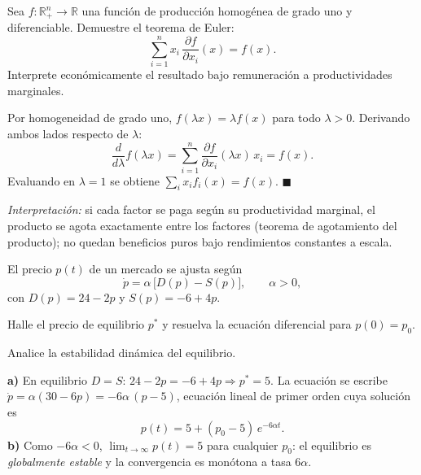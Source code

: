 \documentclass{academic-exam}
\begin{document}
\begin{pregunta}[5][Demostración]
Sea $f\colon\mathbb{R}^{n}_{+}\to\mathbb{R}$ una función de producción
homogénea de grado uno y diferenciable. Demuestre el teorema de Euler:
\[
  \sum_{i=1}^{n} x_i\,\frac{\partial f}{\partial x_i}(x) = f(x).
\]
Interprete económicamente el resultado bajo remuneración a productividades
marginales.
\espaciorespuesta{7cm}
\begin{solucion}
Por homogeneidad de grado uno, $f(\lambda x)=\lambda f(x)$ para todo
$\lambda>0$. Derivando ambos lados respecto de $\lambda$:
\[
  \frac{d}{d\lambda} f(\lambda x)
  = \sum_{i=1}^{n} \frac{\partial f}{\partial x_i}(\lambda x)\,x_i
  = f(x).
\]
Evaluando en $\lambda = 1$ se obtiene
$\sum_i x_i f_i(x) = f(x)$. \hfill$\blacksquare$

\emph{Interpretación:} si cada factor se paga según su productividad
marginal, el producto se agota exactamente entre los factores
(teorema de agotamiento del producto); no quedan beneficios puros bajo
rendimientos constantes a escala.
\end{solucion}
\end{pregunta}

\begin{pregunta}
El precio $p(t)$ de un mercado se ajusta según
\[
  \dot{p} = \alpha\,\bigl[D(p) - S(p)\bigr], \qquad \alpha > 0,
\]
con $D(p) = 24 - 2p$ y $S(p) = -6 + 4p$.
\begin{apartados}
  \item Halle el precio de equilibrio $p^{*}$ y resuelva la ecuación
        diferencial para $p(0)=p_0$. 
  \item Analice la estabilidad dinámica del equilibrio. 
\end{apartados}
\espaciorespuesta{7cm}
\begin{solucion}
\textbf{a)} En equilibrio $D=S$: $24-2p = -6+4p \Rightarrow p^{*}=5$.
La ecuación se escribe $\dot p = \alpha(30 - 6p) = -6\alpha\,(p-5)$,
ecuación lineal de primer orden cuya solución es
\[
  p(t) = 5 + (p_0 - 5)\,e^{-6\alpha t}.
\]
\textbf{b)} Como $-6\alpha<0$, $\lim_{t\to\infty}p(t)=5$ para cualquier
$p_0$: el equilibrio es \emph{globalmente estable} y la convergencia es
monótona a tasa $6\alpha$.
\end{solucion}
\end{pregunta}
\end{document}
